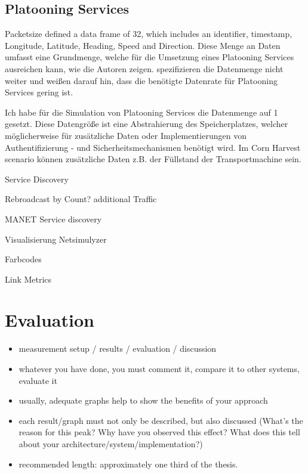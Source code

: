 \documentclass[]{nsm-thesis}
\begin{document}
\section{Platooning Services}

Packetsize 
\textcite{zhang_method_2009} defined a data frame of \SI{32}{\byte}, which includes an identifier, timestamp, Longitude, Latitude, Heading, Speed and Direction.
Diese Menge an Daten umfasst eine Grundmenge, welche für die Umsetzung eines Platooning Services ausreichen kann, wie die Autoren zeigen.
\textcite{schlingmann_aef_2019} spezifizieren die Datenmenge nicht weiter und weißen darauf hin, dass die benötigte Datenrate für Platooning Services gering ist.

Ich habe für die Simulation von Platooning Services die Datenmenge auf \SI{1}{\kilo\byte} gesetzt. Diese Datengröße ist eine Abstrahierung des Speicherplatzes, welcher möglicherweise für zusätzliche Daten oder Implementierungen von Authentifizierung -  und Sicherheitsmechanismen benötigt wird. Im Corn Harvest scenario können zusätzliche Daten z.B. der Füllstand der Transportmachine sein. 


Service Discovery

Rebroadcast by Count?
additional Traffic

MANET Service discovery

Visualisierung Netsimulyzer

Farbcodes


\cite{aust_outdoor_2015} Link Metrics

\chapter{Evaluation}


\begin{itemize}
\item measurement setup / results / evaluation / discussion
\item whatever you have done, you must comment it, compare it to other systems, evaluate it
\item usually, adequate graphs help to show the benefits of your approach
\item each result/graph must not only be described, but also discussed (What's the reason for this peak? Why have you observed this effect? What does this tell about your architecture/system/implementation?)
\item recommended length: approximately one third of the thesis.
\end{itemize}
\end{document}
